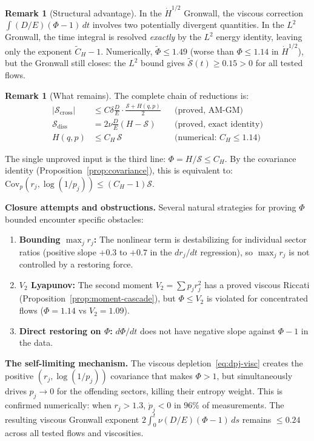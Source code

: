 \documentclass[11pt]{article}
\theoremstyle{definition}
\newtheorem{remark}[theorem]{Remark}
\newcommand{\Hdot}[1]{\dot{H}^{#1}}
\newcommand{\cS}{\mathcal{S}}
\begin{document}
\begin{remark}[Structural advantage]
\label{rem:L2-advantage}
In the $\Hdot{1/2}$ Gronwall, the viscous correction
$\int(D/E)(\Phi-1)\,dt$ involves two potentially
divergent quantities.
In the $L^2$ Gronwall, the time integral is resolved
\emph{exactly} by the $L^2$ energy identity, leaving
only the exponent $\widetilde{C}_H - 1$.
Numerically, $\widetilde{\Phi} \leq 1.49$ (worse than
$\Phi \leq 1.14$ in $\Hdot{1/2}$), but the Gronwall
still closes: the $L^2$ bound gives
$\widetilde{\cS}(t) \geq 0.15 > 0$ for all tested
flows.
\end{remark}

\begin{remark}[What remains]
\label{rem:what-remains-prop}
The complete chain of reductions is:
\begin{align}
|\cS_{\mathrm{cross}}|
&\leq C\delta\frac{D}{E}\cdot
\frac{\cS + H(q,p)}{2}
&&\text{(proved, AM-GM)}
\nonumber\\
\cS_{\mathrm{diss}}
&= 2\nu\frac{D}{E}(H - \cS)
&&\text{(proved, exact identity)}
\nonumber\\
H(q,p) &\leq C_H\,\cS
&&\text{(numerical: $C_H \leq 1.14$)}
\end{align}

The single unproved input is the third line:
$\Phi = H/\cS \leq C_H$.  By the covariance
identity (Proposition~\ref{prop:covariance}),
this is equivalent to:
$\mathrm{Cov}_p(r_j,\log(1/p_j)) \leq (C_H - 1)\cS$.

\smallskip\noindent\textbf{Closure attempts and obstructions.}
Several natural strategies for proving $\Phi$ bounded
encounter specific obstacles:
\begin{enumerate}[label=(\roman*)]
\item \textbf{Bounding $\max_j r_j$:} The nonlinear
term is destabilizing for individual sector ratios
(positive slope $+0.3$ to $+0.7$ in the $dr_j/dt$
regression), so $\max_j r_j$ is not controlled by
a restoring force.
\item \textbf{$V_2$ Lyapunov:} The second moment
$V_2 = \sum p_j r_j^2$ has a proved viscous Riccati
(Proposition~\ref{prop:moment-cascade}), but
$\Phi \leq V_2$ is violated for concentrated flows
($\Phi = 1.14$ vs $V_2 = 1.09$).
\item \textbf{Direct restoring on $\Phi$:}
$d\Phi/dt$ does not have negative slope against
$\Phi - 1$ in the data.
\end{enumerate}

\smallskip\noindent\textbf{The self-limiting mechanism.}
The viscous depletion~\eqref{eq:dpj-visc} creates
the positive $(r_j, \log(1/p_j))$ covariance that makes
$\Phi > 1$, but simultaneously drives $p_j \to 0$ for
the offending sectors, killing their entropy weight.
This is confirmed numerically: when $r_j > 1.3$,
$\dot{p}_j < 0$ in $96\%$ of measurements.  The
resulting viscous Gronwall exponent
$2\int_0^t\nu(D/E)(\Phi-1)\,ds$ remains $\leq 0.24$
across all tested flows and viscosities.


\end{remark}
\end{document}
